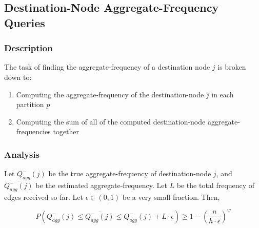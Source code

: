 \subsection{Destination-Node Aggregate-Frequency Queries}

\subsubsection{Description}
The task of finding the aggregate-frequency of a destination node $j$ is broken down to:

\begin{enumerate}
\item Computing the aggregate-frequency of the destination-node $j$ in each partition $p$
\item Computing the sum of all of the computed destination-node aggregate-frequencies together
\end{enumerate}

\subsubsection{Analysis}
\begin{theorem}
\label{agg2}
  Let $Q_{agg}^{-}(j)$ be the true aggregate-frequency of destination-node $j$, and $\overline{Q_{agg}^{-}(j)}$ be the estimated aggregate-frequency. Let $L$ be the total frequency of edges received so far. Let $\epsilon \in (0,1)$ be a very small fraction. Then,
  
  \[
P(Q_{agg}^{-}(j) \leq \overline{Q_{agg}^{-}(j)} \leq Q_{agg}^{-}(j) + L \cdot \epsilon) \geq 1-(\frac{n}{h\cdot\epsilon})^w
\]

\end{theorem}


